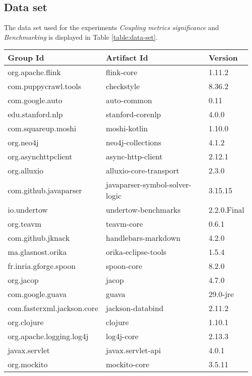 \begin{appendices}
\chapter{Data set}\label{appendix:data-set}
The data set used for the experiments \textit{Coupling metrics significance} and \textit{Benchmarking} is displayed in Table \ref{table:data-set}.

\begin{longtable}[h]{|l|l|l|}
  \hline
  Group Id & Artifact Id & Version \\ \hline
  org.apache.flink & flink-core & 1.11.2 \\ \hline
  com.puppycrawl.tools & checkstyle & 8.36.2 \\ \hline
  com.google.auto & auto-common & 0.11 \\ \hline
  edu.stanford.nlp & stanford-corenlp & 4.0.0 \\ \hline
  com.squareup.moshi & moshi-kotlin & 1.10.0 \\ \hline
  org.neo4j & neo4j-collections & 4.1.2 \\ \hline
  org.asynchttpclient & async-http-client & 2.12.1 \\ \hline
  org.alluxio & alluxio-core-transport & 2.3.0 \\ \hline
  com.github.javaparser & javaparser-symbol-solver-logic & 3.15.15 \\ \hline
  io.undertow & undertow-benchmarks & 2.2.0.Final \\ \hline
  org.teavm & teavm-core & 0.6.1 \\ \hline
  com.github.jknack & handlebars-markdown & 4.2.0 \\ \hline
  ma.glasnost.orika & orika-eclipse-tools & 1.5.4 \\ \hline
  fr.inria.gforge.spoon & spoon-core & 8.2.0 \\ \hline
  org.jacop & jacop & 4.7.0 \\ \hline
  com.google.guava & guava & 29.0-jre \\ \hline
  com.fasterxml.jackson.core & jackson-databind & 2.11.2 \\ \hline
  org.clojure & clojure & 1.10.1 \\ \hline
  org.apache.logging.log4j & log4j-core & 2.13.3 \\ \hline
  javax.servlet & javax.servlet-api & 4.0.1 \\ \hline
  org.mockito & mockito-core & 3.5.11 \\ \hline

\end{longtable}
\end{appendices}
